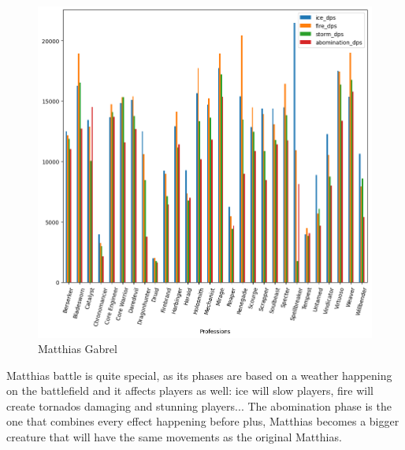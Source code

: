 \documentclass[12pt,a4paper]{article}
\begin{document}
    \begin{figure}[h!]
        
        \centering
        
        \includegraphics[width=1 \linewidth]{matt_dps_plot.png}
        \caption{Matthias Gabrel}
    \end{figure}

    Matthias battle is quite special, as its phases are based on a weather happening on the battlefield and
    it affects players as well: ice will slow players, fire will create tornados damaging and stunning players...
    The abomination phase is the one that combines every effect happening before plus, Matthias becomes a bigger
    creature that will have the same movements as the original Matthias.

    \newpage
\end{document}
